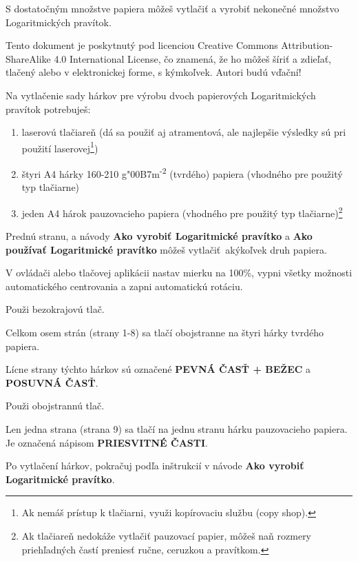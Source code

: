   \begin{multicols*}{3}
  \normalsize{

  S dostatočným množstve papiera môžeš vytlačiť a vyrobiť nekonečné množstvo Logaritmických pravítok.

Tento dokument je poskytnutý pod licenciou Creative Commons Attribution-ShareAlike 4.0 International License, čo znamená, že ho môžeš šíriť a zdieľať, tlačený alebo v elektronickej forme, s kýmkoľvek. Autori budú vďační!

  Na vytlačenie sady hárkov pre výrobu dvoch papierových Logaritmických pravítok potrebuješ:
    \begin{enumerate}
      \setlength{\parskip}{0pt}
      \setlength{\parsep}{0pt}
      \item laserovú tlačiareň (dá sa použiť aj atramentová, ale najlepšie výsledky sú pri použití laserovej\footnote{Ak nemáš prístup k tlačiarni, využi kopírovaciu službu (copy shop).})
      \item štyri A4 hárky 160-210 g{\char"00B7}m\textsuperscript{-2} (tvrdého) papiera (vhodného pre použitý typ tlačiarne)
      \item jeden A4 hárok pauzovacieho papiera (vhodného pre použitý typ tlačiarne)\footnote{Ak tlačiareň nedokáže vytlačiť pauzovací papier, môžeš naň rozmery priehľadných častí preniesť ručne, ceruzkou a pravítkom.}
    \end{enumerate}

Prednú stranu, a návody \textbf{Ako vyrobiť Logaritmické pravítko} a \textbf{Ako používať Logaritmické pravítko} môžeš vytlačiť akýkoľvek druh papiera.

V ovládači alebo tlačovej aplikácii nastav mierku na 100\%, vypni všetky možnosti automatického centrovania a zapni automatickú rotáciu.

Použi bezokrajovú tlač.


Celkom osem strán (strany 1-8) sa tlačí obojstranne na štyri hárky tvrdého papiera.

Lícne strany týchto hárkov sú označené \textbf{PEVNÁ ČASŤ + BEŽEC} a \textbf{POSUVNÁ ČASŤ}.

Použi obojstrannú tlač.


Len jedna strana (strana 9) sa tlačí na jednu stranu hárku pauzovacieho papiera. Je označená nápisom \textbf{PRIESVITNÉ ČASTI}.


Po vytlačení hárkov, pokračuj podľa inštrukcií v návode \textbf{Ako vyrobiť Logaritmické pravítko}.

  }
  \end{multicols*}
  

